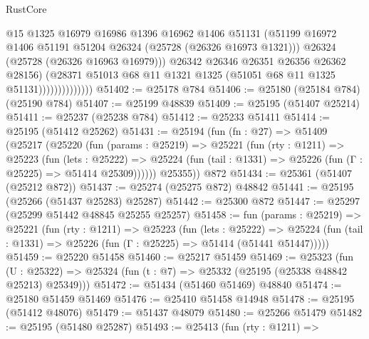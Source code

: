 \begin{lexlean}{RustCore}
\begin{coremodule}
                                @15
                                @1325
                                @16979
                                @16986
                                @1396
                                @16962
                                @1406
                                @51131
                                (@51199
                                  @16972
                                  @1406
                                  @51191
                                  @51204
                                  @26324
                                  (@25728 (@26326 @16973 @1321)))
                                @26324
                                (@25728 (@26326 @16963 @16979)))
                              @26342
                              @26346
                              @26351
                              @26356
                              @26362
                              @28156)
                            (@28371
                              @51013
                              @68
                              @11
                              @1321
                              @1325
                              (@51051 @68 @11 @1325 @51131))))))))))))))
@51402 := @25178 @784
@51406 := @25180 (@25184 @784) (@25190 @784)
@51407 := @25199 @48839
@51409 := @25195 (@51407 @25214)
@51411 := @25237 (@25238 @784)
@51412 := @25233 @51411
@51414 := @25195 (@51412 @25262)
@51431 := @25194
    (fun (fn : @27) =>
    @51409
      (@25217
        (@25220
          (fun (params : @25219) =>
          @25221
            (fun (rty : @1211) =>
            @25223
              (fun (lets : @25222) =>
              @25224 (fun (tail : @1331) => @25226 (fun (Γ : @25225) => @51414 @25309))))))
        @25355))
    @872
@51434 := @25361 (@51407 (@25212 @872))
@51437 := @25274 (@25275 @872) @48842
@51441 := @25195 (@25266 (@51437 @25283) @25287)
@51442 := @25300 @872
@51447 := @25297 (@25299 @51442 @48845 @25255 @25257)
@51458 := fun (params : @25219) =>
  @25221
    (fun (rty : @1211) =>
    @25223
      (fun (lets : @25222) =>
      @25224 (fun (tail : @1331) => @25226 (fun (Γ : @25225) => @51414 (@51441 @51447)))))
@51459 := @25220 @51458
@51460 := @25217 @51459
@51469 := @25323
    (fun (U : @25322) => @25324 (fun (t : @7) => @25332 (@25195 (@25338 @48842 @25213) @25349)))
@51472 := @51434 (@51460 @51469) @48840
@51474 := @25180 @51459 @51469
@51476 := @25410 @51458 @14948
@51478 := @25195 (@51412 @48076)
@51479 := @51437 @48079
@51480 := @25266 @51479
@51482 := @25195 (@51480 @25287)
@51493 := @25413
    (fun (rty : @1211) =>

\end{coremodule}
\end{lexlean}
